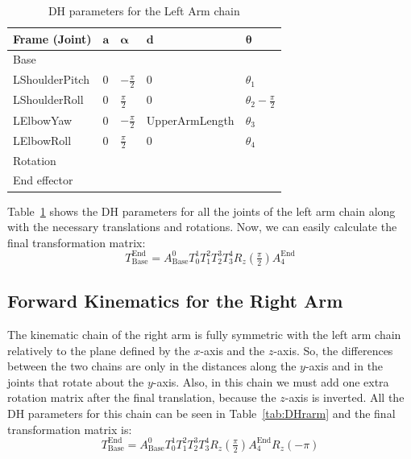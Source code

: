 \begin{table}[t!]
\centering
\caption{DH parameters for the Left Arm chain}
\begin{tabular}{|l|>{\centering\arraybackslash}m{2.55cm}|>{\centering\arraybackslash}m{2.55cm}|>{\centering\arraybackslash}m{2.55cm}|>{\centering\arraybackslash}m{2.55cm}|}
\hline
\textbf{Frame (Joint)} & $\mathbf{a}$ & $\boldsymbol{\alpha}$ & $\mathbf{d}$ & $\boldsymbol{\theta}$\\ \hline
Base & \multicolumn{4}{c|}{$A(0,\text{\footnotesize{ShoulderOffsetY+ElbowOffsetY}},\text{\footnotesize{ShoulderOffsetZ}})$} \\ \hline
LShoulderPitch & $0$ & $-\frac{\pi}{2}$ & $0$ & $\theta_1$ \\ \hline
LShoulderRoll & $0$ & $\frac{\pi}{2}$ & $0$ & $\theta_2 - \frac{\pi}{2}$ \\ \hline
LElbowYaw & $0$ & $-\frac{\pi}{2}$ & \footnotesize{UpperArmLength} & $\theta_3$ \\ \hline
LElbowRoll & $0$ & $\frac{\pi}{2}$ & $0$ & $\theta_4$ \\ \hline
Rotation & \multicolumn{4}{c|}{$R_z(\frac{\pi}{2})$} \\ \hline
End effector & \multicolumn{4}{c|}{$A(\text{\footnotesize{HandOffsetX+LowerArmLength}},0,0)$} \\ \hline
\end{tabular}
\label{tab:DHlarm}
\end{table}

Table~\ref{tab:DHlarm} shows the DH parameters for all the joints of the left arm chain along with the necessary translations and rotations.
Now, we can easily calculate the final transformation matrix:
\[
T^\text{End}_\text{Base} = A^0_\text{Base}T^1_0T^2_1T^3_2T^4_3R_z(\tfrac{\pi}{2})A^\text{End}_{4}
\]

\subsection{Forward Kinematics for the Right Arm}
The kinematic chain of the right arm is fully symmetric with the left arm chain relatively to the plane defined by the $x$-axis and the $z$-axis. So, the differences between the two chains are only in the distances along the $y$-axis and in the joints that rotate about the $y$-axis. Also, in this chain we must add one extra rotation matrix after the final translation, because the $z$-axis is inverted. All the DH parameters for this chain can be seen in Table~\ref{tab:DHrarm} and the final transformation matrix is:
\[
T^\text{End}_\text{Base} = A^0_\text{Base}T^1_0T^2_1T^3_2T^4_3R_z(\tfrac{\pi}{2})A^\text{End}_{4}R_z(-\pi)
\]


